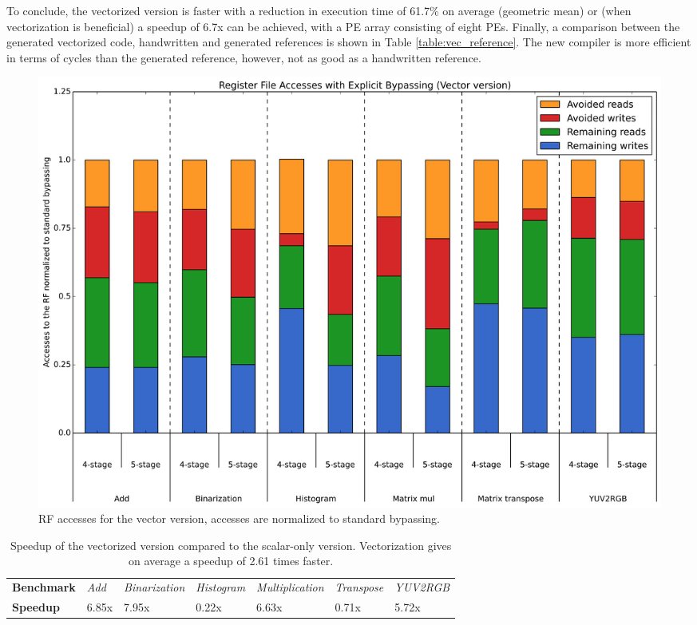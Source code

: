 To conclude, the vectorized version is faster with a reduction in execution time of 61.7\% on average (geometric mean) or (when vectorization is beneficial) a speedup of 6.7x can be achieved, with a PE array consisting of eight PEs. Finally, a comparison between the generated vectorized code, handwritten and generated references is shown in Table \ref{table:vec_reference}. The new compiler is more efficient in terms of cycles than the generated reference, however, not as good as a handwritten reference. 


\begin{figure}[t!]
\centering
\hspace*{-.12in}
\includegraphics[width=.875\textwidth]{figures/stats/vec_accesses}
\caption{RF accesses for the vector version, accesses are normalized to standard bypassing.}
\label{fig:vec_accesses}
\end{figure}

\begin{table}[t!]
\caption{Speedup of the vectorized version compared to the scalar-only version. Vectorization gives on average a speedup of 2.61 times faster.}
\begin{center}
\begin{tabular}{@{}l | l l l l l l @{}}
\toprule
\textbf{Benchmark} 	& \emph{Add} & \emph{Binarization} & \emph{Histogram} & \emph{Multiplication} & \emph{Transpose} & \emph{YUV2RGB}\\
\textbf{Speedup} 	& 6.85x & 7.95x & 0.22x & 6.63x & 0.71x & 5.72x\\
\bottomrule
\end{tabular}
\end{center}
\label{table:vector_speedup}
\end{table}%


